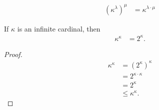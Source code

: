 \documentclass[10pt]{mypackage}
\begin{document}
\begin{theorem}
  \begin{align*}
    \left(\kappa^{\lambda}\right)^{\mu} &= \kappa^{\lambda \cdot \mu}
  \end{align*}
\end{theorem}
\begin{theorem}
  If $\kappa$ is an infinite cardinal, then
  \begin{align*}
    \kappa^{\kappa} &= 2^{\kappa}.
  \end{align*}
\end{theorem}
\begin{proof}
  \begin{align*}
    \kappa^{\kappa} &= \left(2^{\kappa}\right)^{\kappa}\\
                    &= 2^{\kappa\cdot\kappa}\\
                    &= 2^{\kappa}\\
                    &\leq \kappa^{\kappa}.
  \end{align*}
\end{proof}
\end{document}
